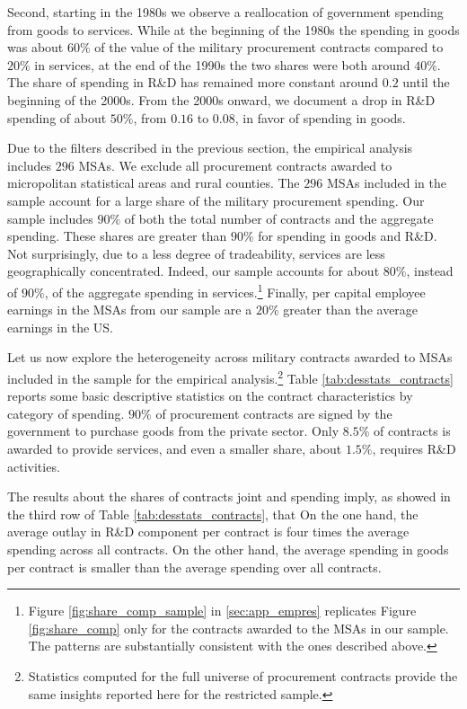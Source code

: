 \documentclass[dv_diss_main.tex]{subfiles}
\begin{document}
Second, starting in the 1980s we observe a reallocation of government spending from goods to services. While at the beginning of the 1980s the spending in goods was about $60\%$ of the value of the military procurement contracts compared to $20\%$ in services, at the end of the 1990s the two shares were both around $40\%$. The share of spending in R\&D has remained more constant around $0.2$ until the beginning of the 2000s. From the 2000s onward, we document a drop in R\&D spending of about $50\%$, from $0.16$ to $0.08$, in favor of spending in goods.

Due to the filters described in the previous section, the empirical analysis includes $296$ MSAs. We exclude all procurement contracts awarded to micropolitan statistical areas and rural counties. The $296$ MSAs included in the sample account for a large share of the military procurement spending. Our sample includes $90\%$ of both the total number of contracts and the aggregate spending. These shares are greater than $90\%$ for spending in goods and R\&D. Not surprisingly, due to a less degree of tradeability, services are less geographically concentrated. Indeed, our sample accounts for about $80\%$, instead of $90\%$, of the aggregate spending in services.\footnote{Figure \ref{fig:share_comp_sample} in \ref{sec:app_empres} replicates Figure \ref{fig:share_comp} only for the contracts awarded to the MSAs in our sample. The patterns are substantially consistent with the ones described above.} Finally, per capital employee earnings in the MSAs from our sample are a $20\%$ greater than the average earnings in the US.

Let us now explore the heterogeneity across military contracts awarded to MSAs included in the sample for the empirical analysis.\footnote{Statistics computed for the full universe of procurement contracts provide the same insights reported here for the restricted sample.} Table \ref{tab:desstats_contracts} reports some basic descriptive statistics on the contract characteristics by category of spending. $90\%$ of procurement contracts are signed by the government to purchase goods from the private sector. Only $8.5\%$ of contracts is awarded to provide services, and even a smaller share, about $1.5\%$, requires R\&D activities. 

The results about the shares of contracts joint and spending imply, as showed in the third row of Table \ref{tab:desstats_contracts}, that On the one hand, the average outlay in R\&D component per contract is four times the average spending across all contracts. On the other hand, the average spending in goods per contract is smaller than the average spending over all contracts. 
\end{document}
